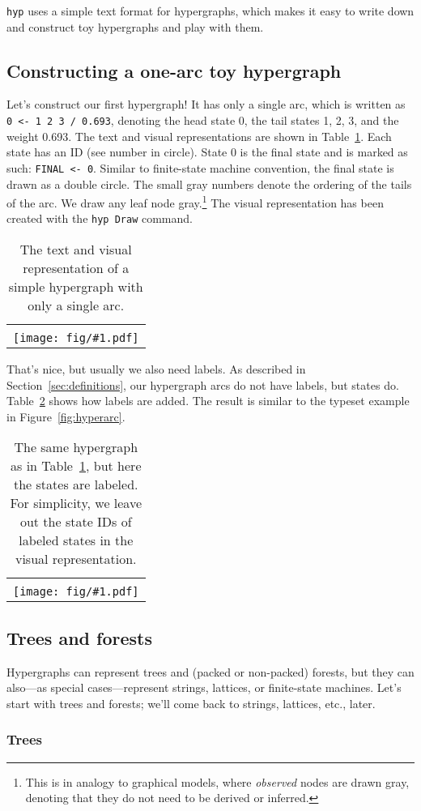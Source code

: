 \documentclass[12pt]{article}
\newcommand{\hyp}{\texttt{hyp}\xspace}
\newcommand{\hypdraw}{\texttt{hyp Draw}\xspace}
\newcommand{\tabref}[1]{Table~\ref{tab:#1}}
\newcommand{\secref}[1]{Section~\ref{sec:#1}}
\newcommand{\figref}[1]{Figure~\ref{fig:#1}}
\newcommand{\exampleb}[3]{
  \begin{table}[!tbp]
    \centering
    \begin{tabular}[h]{ l }\hline
      \begin{minipage}{\textwidth}
        
      \end{minipage}
      \\
      \texttt{[image: fig/\#1.pdf]} \\\hline
    \end{tabular}
    \caption{#2}
    \label{tab:#1}
  \end{table}
}
\begin{document}
\hyp uses a simple text format for hypergraphs, which makes it easy to
write down and construct toy hypergraphs and play with them.

\subsection{Constructing a one-arc toy hypergraph}

Let's construct our first hypergraph! It has only a single arc, which
is written as \texttt{0 <- 1 2 3 / 0.693}, denoting the head state 0,
the tail states 1, 2, 3, and the weight 0.693.  The text and visual
representations are shown in \tabref{one_arc}.  Each state has an ID
(see number in circle). State 0 is the final state and is marked as
such: \texttt{FINAL <- 0}. Similar to finite-state machine convention,
the final state is drawn as a double circle. The small gray numbers
denote the ordering of the tails of the arc. We draw any leaf node
gray.\footnote{This is in analogy to graphical models, where
  \textit{observed} nodes are drawn gray, denoting that they do not need
  to be derived or inferred.}  The visual representation has been
created with the \hypdraw command.  \exampleb{one_arc}{The text and
  visual representation of a simple hypergraph with only a single
  arc.}{0.25}

That's nice, but usually we also need labels. As described in
\secref{definitions}, our hypergraph arcs do not have labels, but
states do. \tabref{one_arc_labels} shows how labels are added. The
result is similar to the typeset example in \figref{hyperarc}.

\exampleb{one_arc_labels}{The same hypergraph as in \tabref{one_arc},
  but here the states are labeled. For simplicity, we leave out the
  state IDs of labeled states in the visual representation.}{0.25}

\subsection{Trees and forests}

Hypergraphs can represent trees and (packed or non-packed) forests,
but they can also---as special cases---represent strings, lattices, or
finite-state machines. Let's start with trees and forests; we'll come
back to strings, lattices, etc., later.

\subsubsection{Trees}\label{sec:tree}
\end{document}
